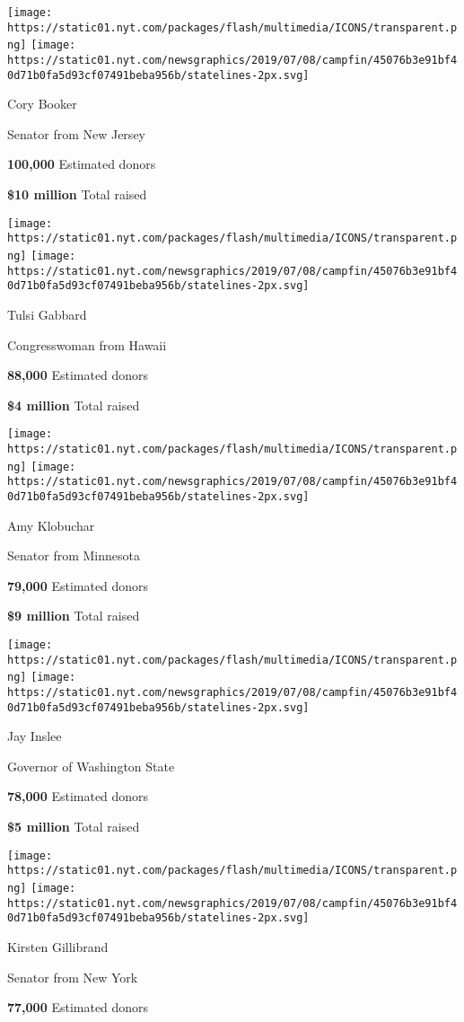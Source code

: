 \texttt{[image: https://static01.nyt.com/packages/flash/multimedia/ICONS/transparent.png]}
\texttt{[image: https://static01.nyt.com/newsgraphics/2019/07/08/campfin/45076b3e91bf40d71b0fa5d93cf07491beba956b/statelines-2px.svg]}

Cory Booker

Senator from New Jersey

\textbf{100,000} Estimated donors

\textbf{\$10 million} Total raised

\texttt{[image: https://static01.nyt.com/packages/flash/multimedia/ICONS/transparent.png]}
\texttt{[image: https://static01.nyt.com/newsgraphics/2019/07/08/campfin/45076b3e91bf40d71b0fa5d93cf07491beba956b/statelines-2px.svg]}

Tulsi Gabbard

Congresswoman from Hawaii

\textbf{88,000} Estimated donors

\textbf{\$4 million} Total raised

\texttt{[image: https://static01.nyt.com/packages/flash/multimedia/ICONS/transparent.png]}
\texttt{[image: https://static01.nyt.com/newsgraphics/2019/07/08/campfin/45076b3e91bf40d71b0fa5d93cf07491beba956b/statelines-2px.svg]}

Amy Klobuchar

Senator from Minnesota

\textbf{79,000} Estimated donors

\textbf{\$9 million} Total raised

\texttt{[image: https://static01.nyt.com/packages/flash/multimedia/ICONS/transparent.png]}
\texttt{[image: https://static01.nyt.com/newsgraphics/2019/07/08/campfin/45076b3e91bf40d71b0fa5d93cf07491beba956b/statelines-2px.svg]}

Jay Inslee

Governor of Washington State

\textbf{78,000} Estimated donors

\textbf{\$5 million} Total raised

\texttt{[image: https://static01.nyt.com/packages/flash/multimedia/ICONS/transparent.png]}
\texttt{[image: https://static01.nyt.com/newsgraphics/2019/07/08/campfin/45076b3e91bf40d71b0fa5d93cf07491beba956b/statelines-2px.svg]}

Kirsten Gillibrand

Senator from New York

\textbf{77,000} Estimated donors

